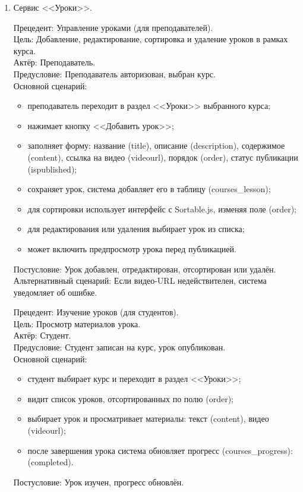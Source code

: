 \begin{enumerate}
	\item {Сервис <<Уроки>>}.
	
	{Прецедент: Управление уроками (для преподавателей)}. \\
	{Цель}: Добавление, редактирование, сортировка и удаление уроков в рамках курса. \\
	{Актёр}: Преподаватель. \\
	{Предусловие}: Преподаватель авторизован, выбран курс. \\
	{Основной сценарий}:
	\begin{itemize}
		\item преподаватель переходит в раздел <<Уроки>> выбранного курса;
		\item нажимает кнопку <<Добавить урок>>;
		\item заполняет форму: название (title), описание (description), содержимое (content), ссылка на видео (videourl), порядок (order), статус публикации (ispublished);
		\item сохраняет урок, система добавляет его в таблицу (courses\_lesson);
		\item для сортировки использует интерфейс с Sortable.js, изменяя поле (order);
		\item для редактирования или удаления выбирает урок из списка;
		\item может включить предпросмотр урока перед публикацией.
	\end{itemize}
	{Постусловие}: Урок добавлен, отредактирован, отсортирован или удалён. \\
	{Альтернативный сценарий}: Если видео-URL недействителен, система уведомляет об ошибке.
	
	{Прецедент: Изучение уроков (для студентов)}. \\
	{Цель}: Просмотр материалов урока. \\
	{Актёр}: Студент. \\
	{Предусловие}: Студент записан на курс, урок опубликован. \\
	{Основной сценарий}:
	\begin{itemize}
		\item студент выбирает курс и переходит в раздел <<Уроки>>;
		\item видит список уроков, отсортированных по полю (order);
		\item выбирает урок и просматривает материалы: текст (content), видео (videourl);
		\item после завершения урока система обновляет прогресс (courses\_progress): (completed).
	\end{itemize}
	{Постусловие}: Урок изучен, прогресс обновлён.
	

\end{enumerate}
